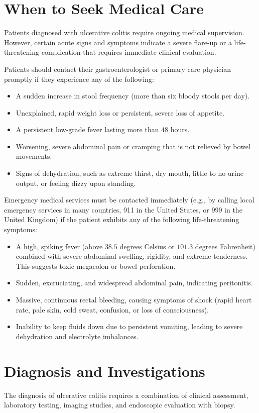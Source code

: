 \section*{When to Seek Medical Care}
Patients diagnosed with ulcerative colitis require ongoing medical supervision. However, certain acute signs and symptoms indicate a severe flare-up or a life-threatening complication that requires immediate clinical evaluation.

Patients should contact their gastroenterologist or primary care physician promptly if they experience any of the following:
\begin{itemize}
  \item A sudden increase in stool frequency (more than six bloody stools per day).
  \item Unexplained, rapid weight loss or persistent, severe loss of appetite.
  \item A persistent low-grade fever lasting more than $48$ hours.
  \item Worsening, severe abdominal pain or cramping that is not relieved by bowel movements.
  \item Signs of dehydration, such as extreme thirst, dry mouth, little to no urine output, or feeling dizzy upon standing.
\end{itemize}

Emergency medical services must be contacted immediately (e.g., by calling local emergency services in many countries, 911 in the United States, or 999 in the United Kingdom) if the patient exhibits any of the following life-threatening symptoms:
\begin{itemize}
  \item A high, spiking fever (above $38.5$ degrees Celsius or $101.3$ degrees Fahrenheit) combined with severe abdominal swelling, rigidity, and extreme tenderness. This suggests toxic megacolon or bowel perforation.
  \item Sudden, excruciating, and widespread abdominal pain, indicating peritonitis.
  \item Massive, continuous rectal bleeding, causing symptoms of shock (rapid heart rate, pale skin, cold sweat, confusion, or loss of consciousness).
  \item Inability to keep fluids down due to persistent vomiting, leading to severe dehydration and electrolyte imbalances.
\end{itemize}

\section*{Diagnosis and Investigations}
The diagnosis of ulcerative colitis requires a combination of clinical assessment, laboratory testing, imaging studies, and endoscopic evaluation with biopsy.

